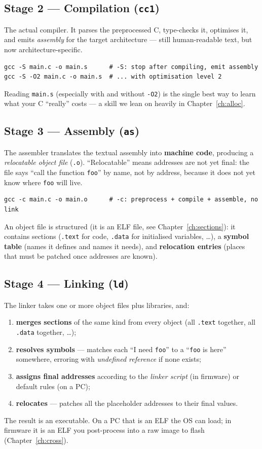 \documentclass[11pt,a4paper,oneside]{book}
\newcommand{\code}[1]{\texttt{#1}}
\begin{document}
\subsection{Stage 2 --- Compilation (\code{cc1})}
The actual compiler. It parses the preprocessed C, type-checks it, optimises it,
and emits \emph{assembly} for the target architecture --- still human-readable
text, but now architecture-specific.
\begin{lstlisting}[style=shell]
gcc -S main.c -o main.s      # -S: stop after compiling, emit assembly
gcc -S -O2 main.c -o main.s  # ... with optimisation level 2
\end{lstlisting}
Reading \code{main.s} (especially with and without \code{-O2}) is the single
best way to learn what your C ``really'' costs --- a skill we lean on heavily in
Chapter~\ref{ch:alloc}.

\subsection{Stage 3 --- Assembly (\code{as})}
The assembler translates the textual assembly into \textbf{machine code},
producing a \emph{relocatable object file} (\code{.o}). ``Relocatable'' means
addresses are not yet final: the file says ``call the function \code{foo}'' by
name, not by address, because it does not yet know where \code{foo} will live.
\begin{lstlisting}[style=shell]
gcc -c main.c -o main.o      # -c: preprocess + compile + assemble, no link
\end{lstlisting}
An object file is structured (it is an ELF file, see Chapter~\ref{ch:sections}):
it contains sections (\code{.text} for code, \code{.data} for initialised
variables, \ldots), a \textbf{symbol table} (names it defines and names it
needs), and \textbf{relocation entries} (places that must be patched once
addresses are known).

\subsection{Stage 4 --- Linking (\code{ld})}
The linker takes one or more object files plus libraries, and:
\begin{enumerate}[leftmargin=1.4cm]
  \item \textbf{merges sections} of the same kind from every object (all
        \code{.text} together, all \code{.data} together, \ldots);
  \item \textbf{resolves symbols} --- matches each ``I need \code{foo}'' to a
        ``\code{foo} is here'' somewhere, erroring with \emph{undefined
        reference} if none exists;
  \item \textbf{assigns final addresses} according to the \emph{linker script}
        (in firmware) or default rules (on a PC);
  \item \textbf{relocates} --- patches all the placeholder addresses to their
        final values.
\end{enumerate}
The result is an executable. On a PC that is an ELF the OS can load; in
firmware it is an ELF you post-process into a raw image to flash
(Chapter~\ref{ch:cross}).
\end{document}

